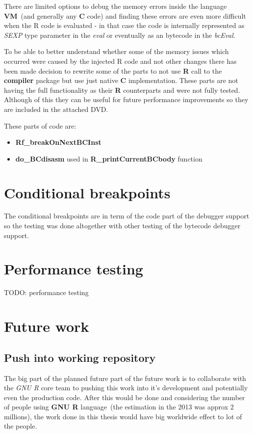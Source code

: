 \documentclass[thesis=M,english]{FITthesis}[2018/10/20]
\begin{document}
{There are limited options to debug the memory errors inside the language \textbf{VM}~(and generally any \textbf{C} code) and finding these errors are even more difficult when the  R code is evaluated - in that case the code is internally represented as \textit{SEXP} type parameter in the \textit{eval} or eventually as an bytecode in the \textit{bcEval}. 

To be able to better understand whether some of the memory issues which occurred were caused by the injected R code and not other changes there has been made decision to rewrite some of the parts to not use \textbf{R} call to the \textbf{compiler} package but use just native \textbf{C} implementation. These parts are not having the full functionality as their \textbf{R} counterparts and were not fully tested. Although of this they can be useful for future performance improvements so they are included in the attached DVD.

These parts of code are:
\begin{itemize}
 \item \textbf{Rf{\_}breakOnNextBCInst}
 \item \textbf{do{\_}BCdisasm} used in \textbf{R{\_}printCurrentBCbody} function
\end{itemize}

\section{Conditional breakpoints}

The conditional breakpoints are in term of the code part of the debugger support so the testing was done altogether with other testing of the bytecode debugger support.

\section{Performance testing}

TODO: performance testing

\section{Future work}

\subsection{Push into working repository}

The big part of the planned future part of the future work is to collaborate with the \textit{GNU R} core team to pushing this work into it's development and potentially even the production code. After this would be done and considering the number of people using \textbf{GNU R} language~(the estimation in the 2013 was approx 2 millions), the work done in this thesis would have big worldwide effect to lot of the people.

}
\end{document}
